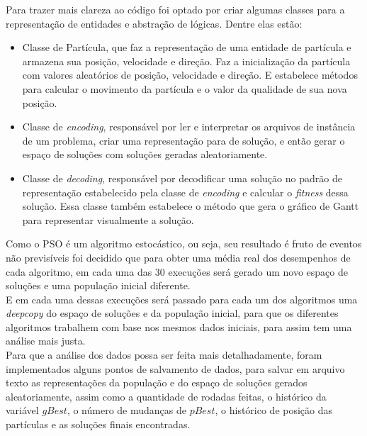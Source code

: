 Para trazer mais clareza ao código foi optado por criar algumas classes para a representação de entidades e abstração de lógicas. Dentre elas estão:
\begin{itemize}
    \item Classe de Partícula, que faz a representação de uma entidade de partícula e armazena sua posição, velocidade e direção. Faz a inicialização da partícula com valores aleatórios de posição, velocidade e direção. E estabelece métodos para calcular o movimento da partícula e o valor da qualidade de sua nova posição.

    \item Classe de \textit{encoding}, responsável por ler e interpretar os arquivos de instância de um problema, criar uma representação para de solução, e então gerar o espaço de soluções com soluções geradas aleatoriamente.

    \item Classe de \textit{decoding}, responsável por decodificar uma solução no padrão de representação estabelecido pela classe de \textit{encoding} e calcular o \textit{fitness} dessa solução. Essa classe também estabelece o método que gera o gráfico de Gantt para representar visualmente a solução.
\end{itemize}

\indent Como o PSO é um algoritmo estocástico, ou seja, seu resultado é fruto de eventos não previsíveis foi decidido que para obter uma média real dos desempenhos de cada algoritmo, em cada uma das 30 execuções será gerado um novo espaço de soluções e uma população inicial diferente.\\
\indent E em cada uma dessas execuções será passado para cada um dos algoritmos uma \textit{deepcopy} do espaço de soluções e da população inicial, para que os diferentes algoritmos trabalhem com base nos mesmos dados iniciais, para assim tem uma análise mais justa.\\
\indent Para que a análise dos dados possa ser feita mais detalhadamente, foram implementados alguns pontos de salvamento de dados, para salvar em arquivo texto as representações da população e do espaço de soluções gerados aleatoriamente, assim como a quantidade de rodadas feitas, o histórico da variável $gBest$, o número de mudanças de $pBest$, o histórico de posição das partículas e as soluções finais encontradas.
%
    

